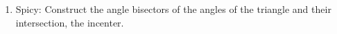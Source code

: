 \documentclass[12pt, oneside]{article}
\begin{document}
\begin{enumerate}
\newpage
  \item Spicy: Construct the angle bisectors of the angles of the triangle and their intersection, the incenter.\\
    \vspace{3cm}
    \begin{center}
    \end{center}

  \end{enumerate}
\end{document}
